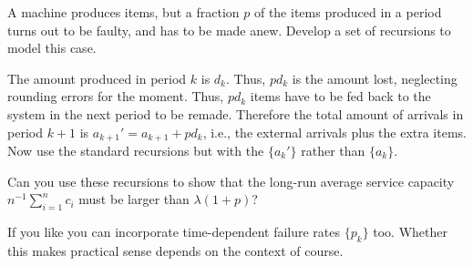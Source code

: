 \begin{extra}
  A machine produces items, but a fraction $p$ of the items produced in a period turns out to be faulty, and has to be made anew.
  Develop a set of recursions to model this case.
\begin{solution}
    The amount produced in period $k$ is $d_k$. Thus, $p d_k$ is the
    amount lost, neglecting rounding errors for the moment. Thus,
    $p d_k$ items have to be fed back to the system in the next period
    to be remade. Therefore the total amount of arrivals in period
    $k+1$ is $a_{k+1}'=a_{k+1}+pd_k$, i.e., the external arrivals plus
    the extra items. Now use the standard recursions but with the
    $\{a_{k}'\}$ rather than $\{a_k\}$.

    Can you use these recursions to show that the long-run average
    service capacity $n^{-1}\sum_{i=1}^n c_i$ must be larger than
    $\lambda(1+p)$?

    If you like you can incorporate time-dependent failure rates
    $\{p_k\}$ too. Whether this makes practical sense depends on the
    context of course.
\end{solution}
\end{extra}

